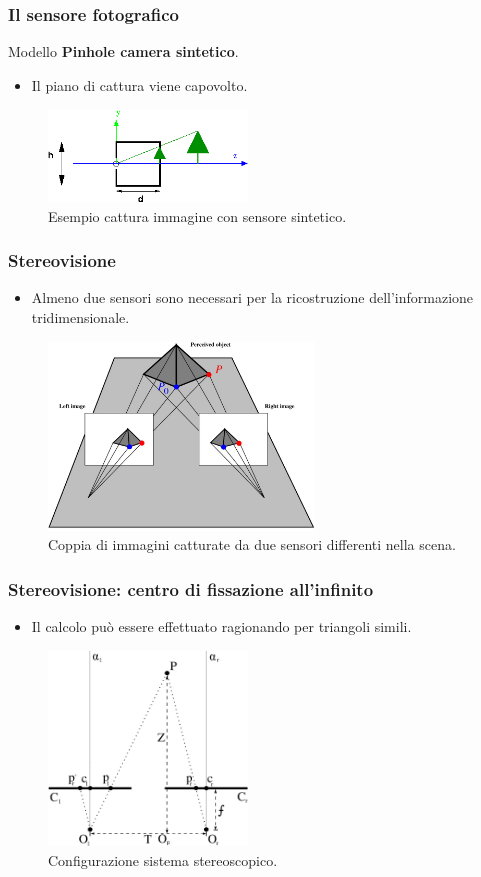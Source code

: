 \documentclass{beamer}
\begin{document}
\begin{frame}
\frametitle{Il sensore fotografico}
Modello \textbf{Pinhole camera sintetico}.
\begin{itemize}
	\item Il piano di cattura viene capovolto.
\end{itemize}
\begin{figure}[h!]
	\centering
	\includegraphics[width=150pt]{imgs/synthetic-and-tree.png}
	\caption{Esempio cattura immagine con sensore sintetico.}
	\label{vis:stereo:virtuale}
\end{figure} 
\end{frame}

\begin{frame}
\frametitle{Stereovisione}
\begin{itemize}
	\item Almeno due sensori sono necessari per la ricostruzione dell'informazione tridimensionale.
\end{itemize}
\begin{figure}[h!]
	\centering
	\includegraphics[width=200pt]{imgs/stereo2.jpg}
	\caption{Coppia di immagini catturate da due sensori differenti nella scena.}
	\label{vis:stereo:pair}
\end{figure} 
\end{frame}

\begin{frame}
\frametitle{Stereovisione: centro di fissazione all'infinito}
\begin{itemize}
	\item Il calcolo può essere effettuato ragionando per triangoli simili.
\end{itemize}
\begin{figure}[h!]
	\centering
	\includegraphics[width=150pt]{imgs/stereo.jpg}
	\caption{Configurazione sistema stereoscopico.}
	\label{vis:stereo:sistem}
\end{figure}
\end{frame}
\end{document}
